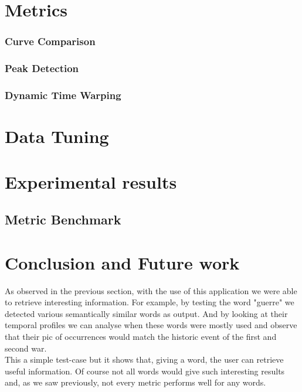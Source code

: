 \documentclass{article}
\begin{document}
\section{Metrics}

\subsubsection{Curve Comparison}

\subsubsection{Peak Detection}

\subsubsection{Dynamic Time Warping}

\section{Data Tuning}

\section{Experimental results}
\subsection{Metric Benchmark}

\section{Conclusion and Future work}

As observed in the previous section, with the use of this application we were able to retrieve interesting information. For example, by testing the word "guerre" we detected various semantically similar words as output. And by looking at their temporal profiles we can analyse when these words were mostly used and observe that their pic of occurrences would match the historic event of the first and second war. \\

This a simple test-case but it shows that, giving a word, the user can retrieve useful information. Of course not all words would give such interesting results and, as we saw previously, not every metric performs well for any words.
\end{document}
